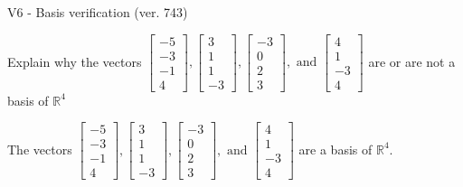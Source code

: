 \begin{exercise}
  \begin{exerciseTitle}V6 - Basis verification (ver. 743)\end{exerciseTitle}
  \begin{exerciseStatement}
    Explain why the vectors \(\left[\begin{array}{r}
-5 \\
-3 \\
-1 \\
4
\end{array}\right] , \left[\begin{array}{r}
3 \\
1 \\
1 \\
-3
\end{array}\right] , \left[\begin{array}{r}
-3 \\
0 \\
2 \\
3
\end{array}\right] , \text{ and } \left[\begin{array}{r}
4 \\
1 \\
-3 \\
4
\end{array}\right]\) are or are not a basis of \(\mathbb{R}^4\)	


  \end{exerciseStatement}
  \begin{exerciseAnswer}
   The vectors \(\left[\begin{array}{r}
-5 \\
-3 \\
-1 \\
4
\end{array}\right] , \left[\begin{array}{r}
3 \\
1 \\
1 \\
-3
\end{array}\right] , \left[\begin{array}{r}
-3 \\
0 \\
2 \\
3
\end{array}\right] , \text{ and } \left[\begin{array}{r}
4 \\
1 \\
-3 \\
4
\end{array}\right]\) 
  	 are  a basis of \(\mathbb{R}^4\).
  


  \end{exerciseAnswer}
\end{exercise}